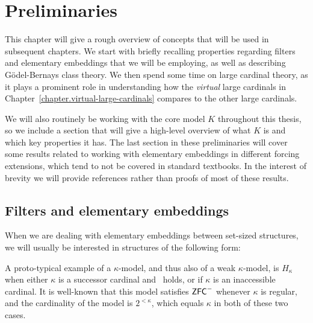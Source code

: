\documentclass[../../main]{subfiles}
\begin{document}
\chapter{Preliminaries}
\thispagestyle{fancy}

This chapter will give a rough overview of concepts that will be used in subsequent chapters. We start with briefly recalling properties regarding filters and elementary embeddings that we will be employing, as well as describing \gbc\, G\"odel-Bernays class theory. We then spend some time on large cardinal theory, as it plays a prominent role in understanding how the \textit{virtual} large cardinals in Chapter~\ref{chapter.virtual-large-cardinals} compares to the other large cardinals.

We will also routinely be working with the core model $K$ throughout this thesis, so we include a section that will give a high-level overview of what $K$ is and which key properties it has. The last section in these preliminaries will cover some results related to working with elementary embeddings in different forcing extensions, which tend to not be covered in standard textbooks. In the interest of brevity we will provide references rather than proofs of most of these results.


\section{Filters and elementary embeddings}
\label{prelims.filters}

When we are dealing with elementary embeddings between set-sized structures, we will usually be interested in structures of the following form:


A proto-typical example of a $\kappa$-model, and thus also of a weak $\kappa$-model, is $H_\kappa$ when either $\kappa$ is a successor cardinal and \gch\ holds, or if $\kappa$ is an inaccessible cardinal. It is well-known that this model satisfies $\textsf{ZFC}^-$ whenever $\kappa$ is regular, and the cardinality of the model is $2^{<\kappa}$, which equals $\kappa$ in both of these two cases.
\end{document}
